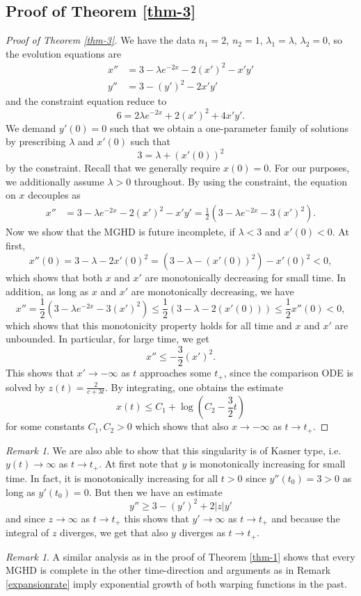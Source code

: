\documentclass[a4paper,10pt]{article}
\theoremstyle{plain}
\theoremstyle{definition}
\theoremstyle{remark}
\newtheorem{rem}[thm]{Remark}
\theoremstyle{plain}
\newcommand{\eq}[1]{\begin{equation}#1\end{equation}}
\newcommand{\alg}[1]{\begin{aligned}#1\end{aligned}}
\numberwithin{equation}{section}
\begin{document}
\subsection{Proof of Theorem \ref{thm-3}}
\begin{proof}[Proof of Theorem \ref{thm-3}]
We have the data $n_1=2$, $n_2=1$, $\lambda_1=\lambda$, $\lambda_2=0$, so the evolution equations are
\eq{\alg{x''&=3-\lambda e^{-2x}-2(x')^2-x'y'\\
	y''&=3-(y')^2-2x'y'}}
and the constraint equation reduce to
\eq{6=2\lambda e^{-2x}+2(x')^2+4x'y'.}
We demand $y'(0)=0$ such that we obtain a one-parameter family of solutions by prescribing $\lambda$ and $x'(0)$ such that
\eq{3=\lambda+(x'(0))^2}
by the constraint. Recall that we generally require $x(0)=0$. For our purposes, we additionally assume $\lambda>0$ throughout.
 By using the constraint, the equation on $x$ decouples as
\eq{\alg{x''&=3-\lambda e^{-2x}-2(x')^2-x'y'=\frac{1}{2}(3-\lambda e^{-2x}-3(x')^2).}}
Now we show that the MGHD is future incomplete, if $\lambda<3$ and $x'(0)<0$. At first,
\eq{x''(0)=3-\lambda-2x'(0)^2=(3-\lambda-(x'(0))^2)-x'(0)^2<0,}
which shows that both $x$ and $x'$ are monotonically decreasing for small time. In addition, as long as $x$ and $x'$ are monotonically decreasing, we have
\eq{x''=\frac{1}{2}(3-\lambda e^{-2x}-3(x')^2)\leq\frac{1}{2}(3-\lambda-2(x'(0)))\leq \frac{1}{2}x''(0)<0,}
which shows that this monotonicity property holds for all time and $x$ and $x'$ are unbounded. In particular, for large time, we get
\eq{x''\leq -\frac{3}{2}(x')^2. }
This shows that $x'\to -\infty$ as $t$ approaches some $t_+$, since the comparison ODE is solved by $z(t)=\frac{2}{c+3t}$. By integrating, one obtains the estimate
\eq{x(t)\leq C_1+\log(C_2-\frac{3}{2}t)}
for some constants  $C_1,C_2>0$ which shows that also $x\to-\infty$ as $t\to t_+$.
 	\end{proof}
 	\begin{rem}We are also able to show that this singularity is of Kasner type, i.e. $y(t)\to\infty$ as $t\to t_+$. At first note that $y$ is monotonically increasing for small time. In fact, it is monotonically increasing for all $t>0$ since $y''(t_0)=3>0$ as long as $y'(t_0)=0$. But then we have an estimate 
\eq{y'' \geq 3-(y')^2+2 |z|y'}
and since $z\to\infty$ as $t\to t_+$ this shows that $y'\to\infty$ as $t\to t_+$ and because the integral of $z$ diverges, we get that also $y$ diverges as $t\to t_+$.
\end{rem}
\begin{rem}
A similar analysis as in the proof of Theorem \ref{thm-1} shows that every MGHD is complete in the other time-direction and arguments as in Remark \ref{expansionrate} imply exponential growth of both warping functions in the past.
\end{rem}
\end{document}
